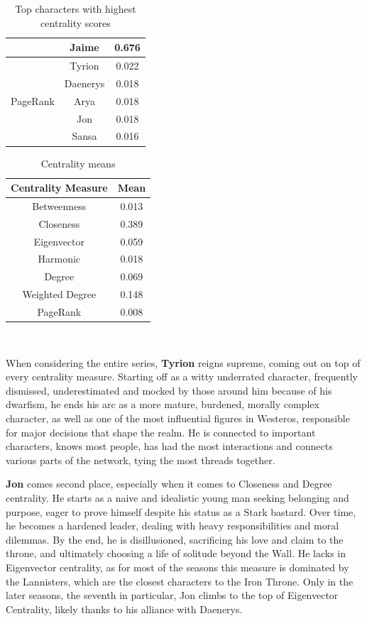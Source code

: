 \documentclass[10pt,twocolumn,letterpaper]{article}
\begin{document}
\begin{table}[!h]
\begin{tabular}{c|c|c}
                    & Jaime & 0.676 \\
        \hline
                    & Tyrion & 0.022 \\
                    & Daenerys & 0.018 \\
        PageRank    & Arya & 0.018 \\
                    & Jon & 0.018 \\
                    & Sansa & 0.016 \\
        \hline
    \end{tabular}
    \vspace{0.2cm}
    \caption{Top characters with highest centrality scores}
    \label{tab:my_label}
\end{table}


\begin{table}[!h]
    \centering
    \begin{tabular}{c|c}
        Centrality Measure & Mean  \\
        \hline
        Betweenness & 0.013 \\
        Closeness & 0.389 \\
        Eigenvector & 0.059 \\
        Harmonic & 0.018 \\
        Degree & 0.069 \\
        Weighted Degree & 0.148 \\
        PageRank & 0.008 \\
        \hline 
    \end{tabular} \\
    \caption{Centrality means}
    \label{tab:my_label}
\end{table}


When considering the entire series, \textbf{Tyrion} reigns supreme, coming out on top of every centrality measure. Starting off as a witty underrated character, frequently dismissed, underestimated and mocked by those around him because of his dwarfism, he ends his arc as a more mature, burdened, morally complex character, as well as one of the most influential figures in Westeros, responsible for major decisions that shape the realm. He is connected to important characters, knows most people, has had the most interactions and connects various parts of the network, tying the most threads together.

\textbf{Jon} comes second place, especially when it comes to Closeness and Degree centrality. He starts as a naive and idealistic young man seeking belonging and purpose, eager to prove himself despite his status as a Stark bastard. Over time, he becomes a hardened leader, dealing with heavy responsibilities and moral dilemmas. By the end, he is disillusioned, sacrificing his love and claim to the throne, and ultimately choosing a life of solitude beyond the Wall. He lacks in Eigenvector centrality, as for most of the seasons this measure is dominated by the Lannisters, which are the closest characters to the Iron Throne. Only in the later seasons, the seventh in particular, Jon climbs to the top of Eigenvector Centrality, likely thanks to his alliance with Daenerys.
\end{document}
